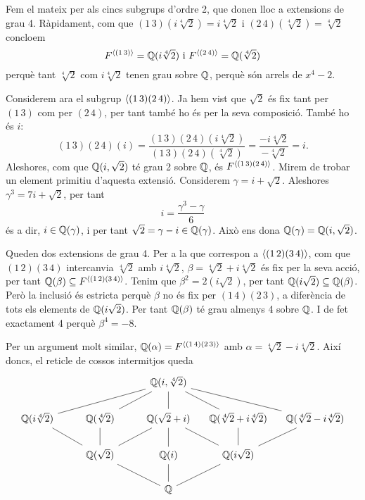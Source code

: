 \documentclass[12pt]{article}
\begin{document}
Fem el mateix per als cincs subgrups d'ordre 2, que donen lloc a extensions de grau 4.
Ràpidament, com que \( (1\,3)(i \sqrt[4]{2}) = i \sqrt[4]{2} \) i \( (2\,4)(\sqrt[4]{2}) =
\sqrt[4]{2} \) concloem
\begin{equation*}
	F^{\left\langle (1\,3) \right\rangle} = \mathbb{Q}(i\sqrt[4]{2}) \text{ i } F^{\left\langle (2\,4) \right\rangle} = \mathbb{Q}(\sqrt[4]{2})
\end{equation*}
perquè tant \( \sqrt[4]{2} \) com \( i\sqrt[4]{2} \) tenen grau sobre \( \mathbb{Q} \), perquè són
arrels de \( x^4 - 2 \). 

Considerem ara el subgrup \( \left\langle (1\,3)(2\,4) \right\rangle \). Ja hem vist que \( \sqrt{2} \) és fix
tant per \( (1\,3) \) com per \( (2\,4) \), per tant també ho és per la seva composició.
També ho és \( i \):
\begin{equation*}
	(1\,3)(2\,4)(i) = \frac{(1\,3)(2\,4)(i\sqrt[4]{2})}{(1\,3)(2\,4)(\sqrt[4]{2})} =
	\frac{-i\sqrt[4]{2}}{-\sqrt[4]{2}} = i.
\end{equation*}
Aleshores, com que \( \mathbb{Q}(i,\sqrt{2}) \) té grau 2 sobre \( \mathbb{Q} \), és \(
F^{\left\langle (1\,3)(2\,4) \right\rangle} \). Mirem de trobar un element primitiu d'aquesta extensió.
Considerem \( \gamma = i + \sqrt{2} \). Aleshores \( \gamma^3 = 7i + \sqrt{2} \), per tant
\begin{equation*}
	i = \frac{\gamma^3 - \gamma}{6}
\end{equation*}
és a dir, \( i \in \mathbb{Q}(\gamma) \), i per tant \( \sqrt{2} = \gamma - i \in \mathbb{Q}(\gamma)
\). Això ens dona \( \mathbb{Q}(\gamma) = \mathbb{Q}(i, \sqrt{2}) \). 

Queden dos extensions de grau 4. Per a la que correspon a \( \left\langle (1\,2)(3\,4) \right\rangle \), com
que \( (1\,2)(3\,4) \) intercanvia \( \sqrt[4]{2} \) amb \( i\sqrt[4]{2} \), \(
\beta = \sqrt[4]{2} + i \sqrt[4]{2} \) és fix per la seva acció, per tant \( \mathbb{Q}(\beta)
\subseteq F^{\left\langle (1\,2)(3\,4) \right\rangle} \). Tenim que \( \beta^2 = 2(i\sqrt{2}) \), per tant \(
\mathbb{Q}(i\sqrt{2}) \subseteq \mathbb{Q}(\beta) \). Però la inclusió és estricta perquè \( \beta \) no
és fix per \( (1\,4)(2\,3) \), a diferència de tots els elements de \( \mathbb{Q}(i\sqrt{2}) \).
Per tant \( \mathbb{Q}(\beta) \) té grau almenys 4 sobre \( \mathbb{Q} \). I de fet exactament 4 perquè \(
\beta^4 = -8 \). 

Per un argument molt similar, \( \mathbb{Q}(\alpha) = F^{\left\langle (1\,4)(2\,3) \right\rangle} \) amb \( \alpha =
\sqrt[4]{2} - i\sqrt[4]{2} \). Així doncs, el reticle de cossos intermitjos queda
\begin{equation*}
	\begin{tikzcd}
		& & \Q(i, \sqrt[4]{2}) \arrow[dll, no head] \arrow[dl, no head] \arrow[d, no head]
		\arrow[dr, no head] \arrow[drr, no head] & & \\
		\Q(i \sqrt[4]{2}) & \Q(\sqrt[4]{2}) & \Q(\sqrt{2} + i)  
											&	\makebox[\widthof{$\Q(\sqrt[4]{2})$}][c]{$\Q(\sqrt[4]{2} +
											i\sqrt[4]{2})$}
											&	\Q(\sqrt[4]{2} - i\sqrt[4]{2}) \\
		& \Q(\sqrt{2}) \arrow[ul, no head] \arrow[u, no head] \arrow[ur, no head] & \Q(i)
		\arrow[u, no head] & \Q(i\sqrt{2}) \arrow[ul, no head] \arrow[u, no head] \arrow[ur, no head]\\
		& & \Q \arrow[ul, no head] \arrow[u, no head] \arrow[ur, no head] & &
	\end{tikzcd}
\end{equation*}
\end{document}
